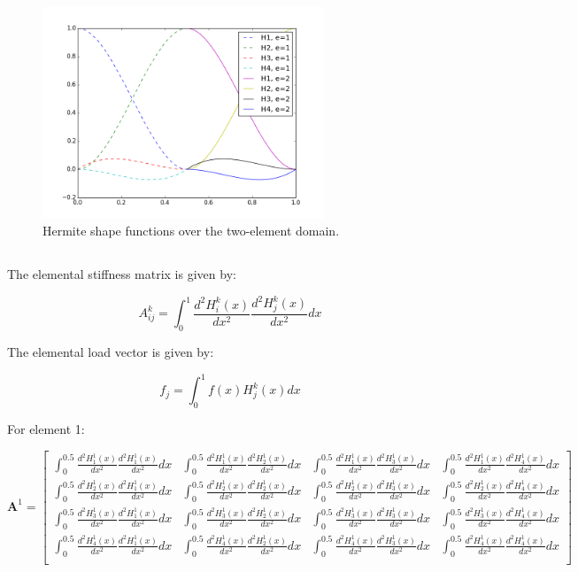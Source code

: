 \documentclass[10pt]{article}
\newcommand{\beq}{\begin{equation}}
\newcommand{\eeq}{\end{equation}}
\begin{document}
\begin{figure}[H]
\centering
\includegraphics[width=0.75\textwidth]{q2_Hermite_functions.png}
\caption{Hermite shape functions over the two-element domain.}
\label{fig:1}
\end{figure}

\subsection{}

The elemental stiffness matrix is given by:

\beq
A_{ij}^k=\int_0^1\frac{d^2H_i^k(x)}{dx^2}\frac{d^2H_j^k(x)}{dx^2}dx
\eeq

The elemental load vector is given by:

\beq
f_j=\int_{0}^{1}f(x)H_j^k(x)dx
\eeq

For element 1:

\beq
\textbf{A}^1=\begin{bmatrix}
\int_{0}^{0.5}\frac{d^2H_1^1(x)}{dx^2}\frac{d^2H_1^1(x)}{dx^2}dx & \int_{0}^{0.5}\frac{d^2H_1^1(x)}{dx^2}\frac{d^2H_2^1(x)}{dx^2}dx & \int_{0}^{0.5}\frac{d^2H_1^1(x)}{dx^2}\frac{d^2H_3^1(x)}{dx^2}dx & \int_{0}^{0.5}\frac{d^2H_1^1(x)}{dx^2}\frac{d^2H_4^1(x)}{dx^2}dx\\
\int_{0}^{0.5}\frac{d^2H_2^1(x)}{dx^2}\frac{d^2H_1^1(x)}{dx^2}dx & \int_{0}^{0.5}\frac{d^2H_2^1(x)}{dx^2}\frac{d^2H_2^1(x)}{dx^2}dx & \int_{0}^{0.5}\frac{d^2H_2^1(x)}{dx^2}\frac{d^2H_3^1(x)}{dx^2}dx & \int_{0}^{0.5}\frac{d^2H_2^1(x)}{dx^2}\frac{d^2H_4^1(x)}{dx^2}dx\\
\int_{0}^{0.5}\frac{d^2H_3^1(x)}{dx^2}\frac{d^2H_1^1(x)}{dx^2}dx & \int_{0}^{0.5}\frac{d^2H_3^1(x)}{dx^2}\frac{d^2H_2^1(x)}{dx^2}dx & \int_{0}^{0.5}\frac{d^2H_3^1(x)}{dx^2}\frac{d^2H_3^1(x)}{dx^2}dx & \int_{0}^{0.5}\frac{d^2H_3^1(x)}{dx^2}\frac{d^2H_4^1(x)}{dx^2}dx\\
\int_{0}^{0.5}\frac{d^2H_4^1(x)}{dx^2}\frac{d^2H_1^1(x)}{dx^2}dx & \int_{0}^{0.5}\frac{d^2H_4^1(x)}{dx^2}\frac{d^2H_2^1(x)}{dx^2}dx & \int_{0}^{0.5}\frac{d^2H_4^1(x)}{dx^2}\frac{d^2H_3^1(x)}{dx^2}dx & \int_{0}^{0.5}\frac{d^2H_4^1(x)}{dx^2}\frac{d^2H_4^1(x)}{dx^2}dx\\
\end{bmatrix}
\eeq
\end{document}
